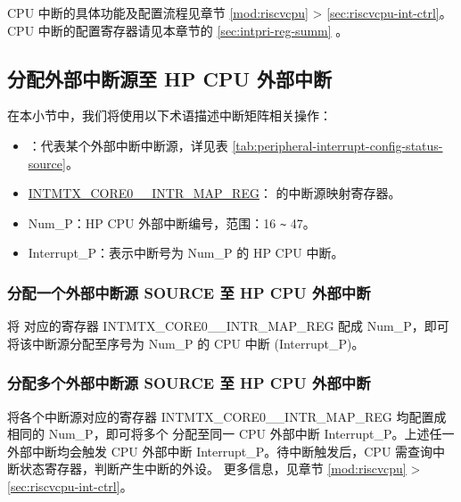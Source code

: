 \documentclass[main\_\_CN.tex]{subfiles}
\begin{document}
\begin{tiplisting}
CPU 中断的具体功能及配置流程见章节 \ref{mod:riscvcpu} \textit{} >  \ref{sec:riscvcpu-int-ctrl}\textit{}。CPU 中断的配置寄存器请见本章节的 \ref{sec:intpri-reg-summ} \textit{}。
\end{tiplisting}
\vspace{-1em}


\subsection{分配外部中断源至 HP CPU 外部中断}

在本小节中，我们将使用以下术语描述中断矩阵相关操作：

\begin{itemize}

\item {}：代表某个外部中断中断源，详见表 \ref{tab:peripheral-interrupt-config-status-source}。

\item \hyperref[INTMTXCORE0SOURCEINTRMAPREG]{INTMTX\_CORE0\_\_INTR\_MAP\_REG}： 的中断源映射寄存器。
\item Num\_P：HP CPU 外部中断编号，范围：16 \verb+~+ 47。

\item Interrupt\_P：表示中断号为 Num\_P 的 HP CPU 中断。
\end{itemize}

\subsubsection{分配一个外部中断源 SOURCE 至 HP CPU 外部中断}

将  对应的寄存器 INTMTX\_CORE0\_\_INTR\_MAP\_REG 配成 Num\_P，即可将该中断源分配至序号为 Num\_P 的 CPU 中断 (Interrupt\_P)。

\subsubsection{分配多个外部中断源 SOURCE 至 HP CPU 外部中断}

将各个中断源对应的寄存器 INTMTX\_CORE0\_\_INTR\_MAP\_REG 均配置成相同的 Num\_P，即可将多个  分配至同一 CPU 外部中断 Interrupt\_P。上述任一外部中断均会触发 CPU 外部中断 Interrupt\_P。待中断触发后，CPU 需查询中断状态寄存器，判断产生中断的外设。 更多信息，见章节 \ref{mod:riscvcpu} \textit{} >  \ref{sec:riscvcpu-int-ctrl}\textit{}。
\end{document}
